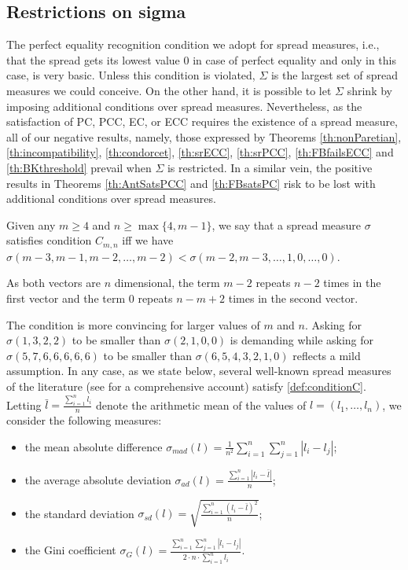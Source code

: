 \documentclass[version=3.21, pagesize, twoside=off, bibliography=totoc, DIV=calc, fontsize=12pt, a4paper]{scrartcl}
\begin{document}
\subsection{Restrictions on sigma}
\label{sec:RestrictionOnSigma}
The perfect equality recognition condition we adopt for spread measures, i.e., that the spread gets its lowest value $0$ in case of perfect equality and only in this case, is very basic. Unless this condition is violated, $\Sigma$ is the largest set of spread measures we could conceive. On the other hand, it is possible to let $\Sigma$ shrink by imposing additional conditions over spread measures. Nevertheless, as the satisfaction of PC, PCC, EC, or ECC requires the existence of a spread measure, all of our negative results, namely, those expressed by Theorems \ref{th:nonParetian}, \ref{th:incompatibility}, \ref{th:condorcet}, \ref{th:srECC}, \ref{th:srPCC}, \ref{th:FBfailsECC} and \ref{th:BKthreshold} prevail when $\Sigma$ is restricted. In a similar vein, the positive results in Theorems \ref{th:AntSatsPCC} and \ref{th:FBsatsPC} risk to be lost with additional conditions over spread measures.

\begin{definition}
	\label{def:conditionC}
	Given any $m\geq4$ and $n\geq \max\{4,m-1\}$, we say that a spread measure $\sigma$ satisfies condition $C_{m,n}$ iff we have $\sigma(m-3, m-1, m-2, \dots, m-2) < \sigma(m-2, m-3, \dots, 1, 0, \dots, 0)$.
\end{definition}

As both vectors are $n$ dimensional, the term $m-2$ repeats $n-2$ times in the first vector and the term $0$ repeats $n-m+2$ times in the second vector.

The condition is more convincing for larger values of $m$ and $n$. Asking for $\sigma(1,3,2,2)$ to be smaller than $\sigma(2,1,0,0)$ is demanding while asking for $\sigma(5,7,6,6,6,6,6)$ to be smaller than $\sigma(6,5,4,3,2,1,0)$ reflects a mild assumption. In any case, as we state below, several well-known spread measures of the literature (see \citet{Allison1978} for a comprehensive account) satisfy \cref{def:conditionC}. Letting $\bar{l}=\frac{\sum_{i=1}^{n}l_i}{n}$ denote the arithmetic mean of the values of $l = (l_1, …, l_n)$, we consider the following measures:

\begin{itemize}
	\item the mean absolute difference $\sigma_{mad}(l)= \frac{1}{n^2} \sum_{i=1}^{n}\sum_{j=1}^{n}|l_i-l_j|$;
	\item the average absolute deviation $\sigma_{ad}(l)= \frac{\sum_{i=1}^{n}|l_i-\bar{l}|}{n}$;
	\item the standard deviation $\sigma_{sd}(l)= \sqrt{\frac{\sum_{i=1}^{n}(l_i-\bar{l})^2}{n}}$;
	\item the Gini coefficient $\sigma_{G}(l)= \frac{\sum_{i=1}^{n}\sum_{j=1}^{n}|l_i-l_j|}{2 \cdot n \cdot \sum_{i=1}^{n} l_i}$.
\end{itemize} 
\end{document}
